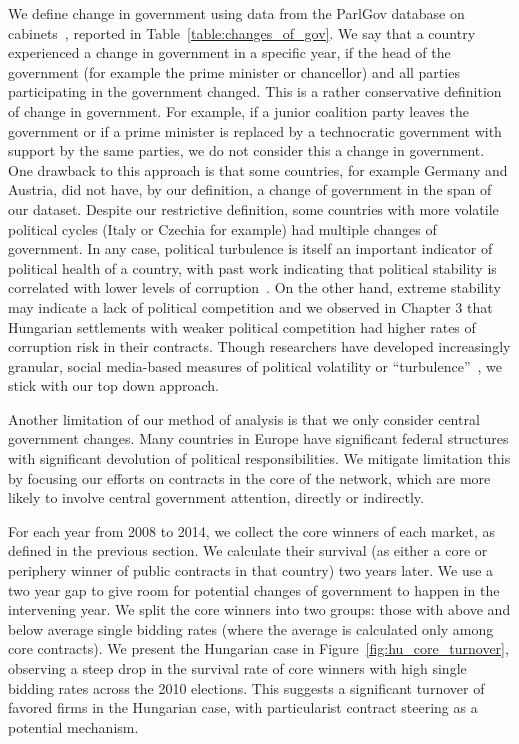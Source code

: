 We define change in government using data from the ParlGov database on cabinets~\cite{doring2010parliament}, reported in Table~\ref{table:changes_of_gov}. We say that a country experienced a change in government in a specific year, if the head of the government (for example the prime minister or chancellor) and all parties participating in the government changed. This is a rather conservative definition of change in government. For example, if a junior coalition party leaves the government or if a prime minister is replaced by a technocratic government with support by the same parties, we do not consider this a change in government. One drawback to this approach is that some countries, for example Germany and Austria, did not have, by our definition, a change of government in the span of our dataset. Despite our restrictive definition, some countries with more volatile political cycles (Italy or Czechia for example) had multiple changes of government. In any case, political turbulence is itself an important indicator of political health of a country, with past work indicating that political stability is correlated with lower levels of corruption~\cite{lederman2005accountability}. On the other hand, extreme stability may indicate a lack of political competition and we observed in Chapter 3 that Hungarian settlements with weaker political competition had higher rates of corruption risk in their contracts. Though researchers have developed increasingly granular, social media-based measures of political volatility or ``turbulence''~\cite{margetts2015political}, we stick with our top down approach. 

Another limitation of our method of analysis is that we only consider central government changes. Many countries in Europe have significant federal structures with significant devolution of political responsibilities. We mitigate limitation this by focusing our efforts on contracts in the core of the network, which are more likely to involve central government attention, directly or indirectly.

For each year from 2008 to 2014, we collect the core winners of each market, as defined in the previous section. We calculate their survival (as either a core or periphery winner of public contracts in that country) two years later. We use a two year gap to give room for potential changes of government to happen in the intervening year. We split the core winners into two groups: those with above and below average single bidding rates (where the average is calculated only among core contracts). We present the Hungarian case in Figure~\ref{fig:hu_core_turnover}, observing a steep drop in the survival rate of core winners with high single bidding rates across the 2010 elections. This suggests a significant turnover of favored firms in the Hungarian case, with particularist contract steering as a potential mechanism.

